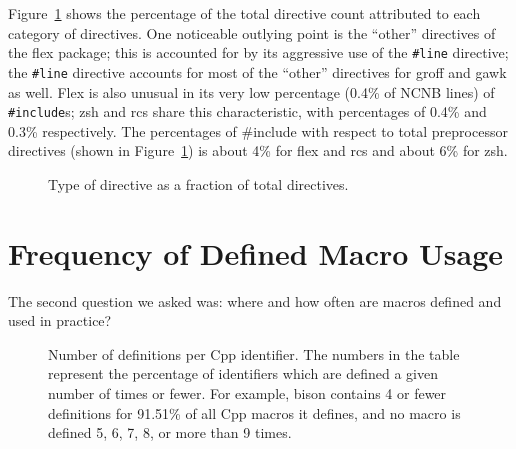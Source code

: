 \documentclass[11pt]{article}
\begin{document}
Figure~\ref{fig:total_directives} shows the percentage of the total
directive count attributed to each category of directives.  One
noticeable outlying point is the ``other'' directives of the flex
package; this is accounted for by its aggressive use of the
{\tt \#line} directive; the {\tt \#line} directive accounts for most of the
``other'' directives for groff and gawk as well.  Flex is also unusual in
its very low percentage (0.4\% of NCNB lines) of {\tt \#include}s; zsh and 
rcs share this characteristic, with percentages of 0.4\% and 0.3\%
respectively.  The percentages of {\#include} with respect to total
preprocessor directives (shown in Figure~\ref{fig:total_directives}) is
about 4\% for flex and rcs and about 6\% for zsh.

\begin{figure}
\centerline{}
\caption{Type of directive as a fraction of total directives.}
\label{fig:total_directives}
\end{figure}

\section{Frequency of Defined Macro Usage}
\label{sec:usage}

The second question we asked was: where and how often are macros
defined and used in practice?  

%
%


\begin{figure}
{\small
  \setlength{\tabcolsep}{.25em}
}
\caption{Number of definitions per Cpp identifier.  The numbers in the
  table represent the percentage of identifiers which are defined a given
  number of times or fewer.  For example, bison contains 4 or fewer
  definitions for 91.51\% of all Cpp macros it defines, and no
  macro is defined 5, 6, 7, 8, or more than 9 times.}
\label{fig:define_count}
\end{figure}
\end{document}
